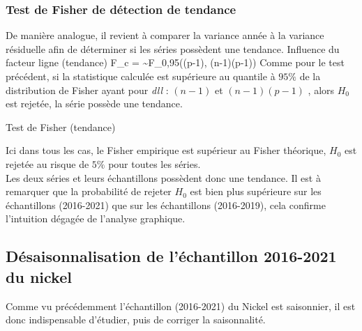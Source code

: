 \subsubsection*{Test de Fisher de détection de tendance}
De manière analogue, il revient à comparer la variance année à la variance résiduelle afin de déterminer si les séries possèdent une tendance.
    {Influence du facteur ligne (tendance)}
    {F_{c} =  \sim F_{0,95}((p-1), (n-1)(p-1))}
Comme pour le test précédent, si la statistique calculée est supérieure au quantile à $ 95\% $ 
de la distribution de Fisher ayant pour \textit{dll} : $(n-1)$ et $(n-1)(p-1)$ , alors $ H_{0} $ est rejetée, la série possède une tendance.
\begin{table}[H]
    \centering
    \caption{Test de Fisher (tendance)}
    \sffamily
    
\end{table}
Ici dans tous les cas, le Fisher empirique est supérieur au Fisher théorique, $H_{0}$ est rejetée
au risque de $ 5\% $ pour toutes les séries. \\[11pt]
Les deux séries et leurs échantillons possèdent donc une tendance. Il est à remarquer que la probabilité de rejeter 
$H_{0}$ est bien plus supérieure sur les échantillons (2016-2021) que sur les échantillons (2016-2019),
cela confirme l'intuition dégagée de l'analyse graphique.

\subsection{Désaisonnalisation de l'échantillon 2016-2021 du nickel}
Comme vu précédemment l'échantillon (2016-2021) du Nickel est saisonnier, il est donc indispensable d'étudier, puis de corriger la saisonnalité. 
